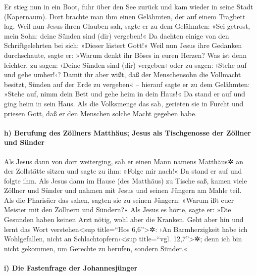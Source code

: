  Er stieg nun in ein Boot, fuhr über den See zurück und
kam wieder in seine Stadt (Kapernaum).  Dort brachte man
ihm einen Gelähmten, der auf einem Tragbett lag. Weil nun Jesus ihren
Glauben sah, sagte er zu dem Gelähmten: »Sei getrost, mein Sohn: deine
Sünden sind (dir) vergeben!«  Da dachten einige von den
Schriftgelehrten bei sich: »Dieser lästert Gott!«  Weil
nun Jesus ihre Gedanken durchschaute, sagte er: »Warum denkt ihr Böses
in euren Herzen?  Was ist denn leichter, zu sagen: ›Deine
Sünden sind (dir) vergeben‹ oder zu sagen: ›Stehe auf und gehe umher!‹?
 Damit ihr aber wißt, daß der Menschensohn die Vollmacht
besitzt, Sünden auf der Erde zu vergeben« -- hierauf sagte er zu dem
Gelähmten: »Stehe auf, nimm dein Bett und gehe heim in dein Haus!«
 Da stand er auf und ging heim in sein Haus.
 Als die Volksmenge das sah, gerieten sie in Furcht und
priesen Gott, daß er den Menschen solche Macht gegeben habe.

\hypertarget{h-berufung-des-zuxf6llners-matthuxe4us-jesus-als-tischgenosse-der-zuxf6llner-und-suxfcnder}{%
\paragraph{h) Berufung des Zöllners Matthäus; Jesus als Tischgenosse der
Zöllner und
Sünder}\label{h-berufung-des-zuxf6llners-matthuxe4us-jesus-als-tischgenosse-der-zuxf6llner-und-suxfcnder}}

 Als Jesus dann von dort weiterging, sah er einen Mann
namens Matthäus✲ an der Zollstätte sitzen und sagte zu ihm: »Folge mir
nach!« Da stand er auf und folgte ihm.  Als Jesus dann im
Hause (des Matthäus) zu Tische saß, kamen viele Zöllner und Sünder und
nahmen mit Jesus und seinen Jüngern am Mahle teil.  Als
die Pharisäer das sahen, sagten sie zu seinen Jüngern: »Warum ißt euer
Meister mit den Zöllnern und Sündern?«  Als Jesus es
hörte, sagte er: »Die Gesunden haben keinen Arzt nötig, wohl aber die
Kranken.  Geht aber hin und lernt das Wort
verstehen\textless sup title=``Hos 6,6''\textgreater✲: ›An
Barmherzigkeit habe ich Wohlgefallen, nicht an
Schlachtopfern‹\textless sup title=``vgl. 12,7''\textgreater✲; denn ich
bin nicht gekommen, um Gerechte zu berufen, sondern Sünder.«

\hypertarget{i-die-fastenfrage-der-johannesjuxfcnger}{%
\paragraph{i) Die Fastenfrage der
Johannesjünger}\label{i-die-fastenfrage-der-johannesjuxfcnger}}

